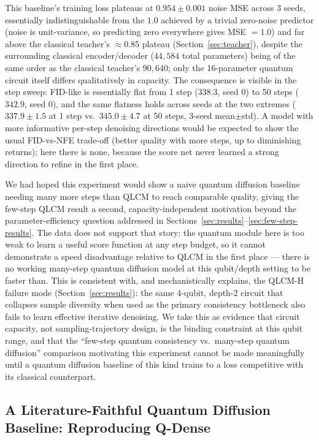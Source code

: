 \documentclass[11pt]{article}
\begin{document}
This baseline's training loss plateaus at $0.954\pm0.001$ noise MSE across 3
seeds, essentially indistinguishable from the $1.0$ achieved by a trivial
zero-noise predictor (noise is unit-variance, so predicting zero everywhere
gives MSE $=1.0$) and far above the classical teacher's $\approx$0.85
plateau (Section~\ref{sec:teacher}), despite the surrounding
classical encoder/decoder ($44{,}584$ total parameters) being of the same
order as the classical teacher's $90{,}640$; only the 16-parameter quantum
circuit itself differs qualitatively in capacity. The consequence is visible
in the step sweep: FID-like is essentially flat from 1 step ($338.3$, seed 0)
to 50 steps ($342.9$, seed 0), and the same flatness holds across seeds at
the two extremes ($337.9\pm1.5$ at 1 step vs.\ $345.0\pm4.7$ at 50 steps,
3-seed mean$\pm$std). A model with more informative per-step denoising
directions would be expected to show the usual FID-vs-NFE trade-off (better
quality with more steps, up to diminishing returns); here there is none,
because the score net never learned a strong direction to refine in the
first place.

We had hoped this experiment would show a naive quantum diffusion baseline
needing many more steps than QLCM to reach comparable quality, giving the
few-step QLCM result a second, capacity-independent motivation beyond the
parameter-efficiency question addressed in
Sections~\ref{sec:results}--\ref{sec:few-step-results}. The data does not
support that story: the quantum module here is too weak to learn a useful
score function at any step budget, so it cannot demonstrate a speed
disadvantage relative to QLCM in the first place --- there is no working
many-step quantum diffusion model at this qubit/depth setting to be faster
than. This is consistent with, and mechanistically explains, the QLCM-H
failure mode (Section~\ref{sec:results}): the same 4-qubit, depth-2 circuit
that collapses sample diversity when used as the primary consistency
bottleneck also fails to learn effective iterative denoising. We take this as
evidence that circuit capacity, not sampling-trajectory design, is the
binding constraint at this qubit range, and that the ``few-step quantum
consistency vs.\ many-step quantum diffusion'' comparison motivating this
experiment cannot be made meaningfully until a quantum diffusion baseline of
this kind trains to a loss competitive with its classical counterpart.

\subsection{A Literature-Faithful Quantum Diffusion Baseline: Reproducing Q-Dense}
\label{sec:qdense-baseline}
\end{document}
